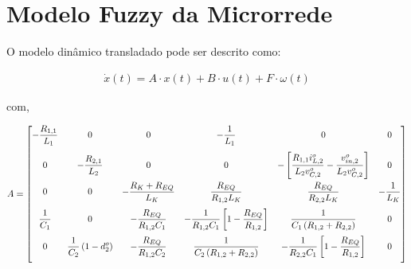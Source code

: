 \section*{Modelo Fuzzy da Microrrede}

O modelo dinâmico transladado pode ser descrito como:

\begin{gather*}
    \dot{x}(t) = A \cdot x(t) + B \cdot u(t) + F \cdot \omega(t)
\end{gather*}

com,

\begin{gather}
  A = \begin{bmatrix}
    \displaystyle - \frac{R_{1,1}}{L_1} & 0                         & 0                                         & \displaystyle - \frac{1}{L_1}                  & 0                                    & 0                           \\[12pt]
    0                         & \displaystyle - \frac{R_{2,1}}{L_2} & 0                                         & 0                                    & \displaystyle - \left[ \frac{R_{1,1} i_{L,2}^o}{L_2 v_{C,2}^o} - \frac{v_{in,2}^o}{L_2 v_{C,2}^o} \right]                  & 0                           \\[12pt]
    0                         & 0                         & - \displaystyle \frac{R_K + R_{EQ}}{L_K}   & \displaystyle \frac{R_{EQ}}{R_{1,2} L_K}              & \displaystyle \frac{R_{EQ}}{R_{2,2} L_K}              & - \displaystyle \frac{1}{L_K}         \\[12pt]
    \displaystyle \frac{1}{C_1}         & 0                         & \displaystyle - \frac{R_{EQ}}{R_{1,2} C_1}                 & \displaystyle - \frac{1}{R_{1,2}C_1} \left[ 1 - \frac{R_{EQ}}{R_{1,2}} \right] & \displaystyle \frac{1}{C_1 \left(R_{1,2} + R_{2,2}\right)}       & 0                           \\[12pt]
    0                         & \displaystyle \frac{1}{C_2} \left( 1 - d_2^o \right)         & \displaystyle - \frac{R_{EQ}}{R_{1,2} C_2} & \displaystyle \frac{1}{C_2 \left(R_{1,2} + R_{2,2}\right)}      & \displaystyle - \frac{1}{R_{2,2}C_1} \left[ 1 - \frac{R_{EQ}}{R_{1,2}} \right] & 0                           \\[12pt]

\end{bmatrix}
\end{gather}
